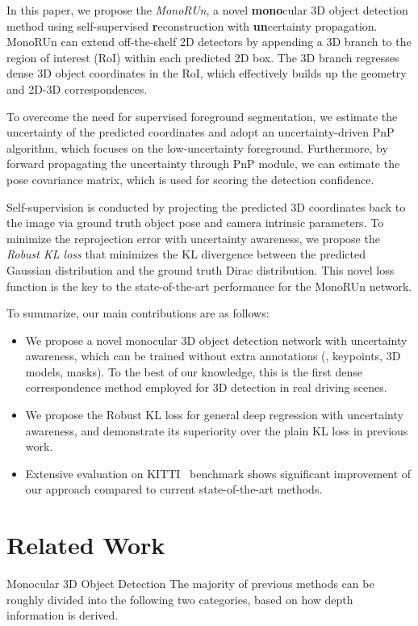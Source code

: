 \documentclass[10pt,twocolumn,letterpaper]{article}
\makeatletter
\renewcommand{\paragraph}{
  \@startsection{paragraph}{4}
  {\z@}{0.7ex \@plus .2ex \@minus .1ex}{-1em}
  {\normalfont\normalsize\bfseries}
}
\makeatother
\begin{document}
In this paper, we propose the \textit{MonoRUn}, a novel \textbf{mono}cular 3D object detection method using self-supervised \textbf{r}econstruction with \textbf{un}certainty propagation. MonoRUn can extend off-the-shelf 2D detectors by appending a 3D branch to the region of interest (RoI) within each predicted 2D box. The 3D branch regresses dense 3D object coordinates in the RoI, which effectively builds up the geometry and 2D-3D correspondences. 

To overcome the need for supervised foreground segmentation, we estimate the uncertainty of the predicted coordinates and adopt an uncertainty-driven PnP algorithm, which focuses on the low-uncertainty foreground. Furthermore, by forward propagating the uncertainty through PnP module, we can estimate the pose covariance matrix, which is used for scoring the detection confidence.

Self-supervision is conducted by projecting the predicted 3D coordinates back to the image via ground truth object pose and camera intrinsic parameters. To minimize the reprojection error with uncertainty awareness, we propose the \textit{Robust KL loss} that minimizes the KL divergence between the predicted Gaussian distribution and the ground truth Dirac distribution. This novel loss function is the key to the state-of-the-art performance for the MonoRUn network.

To summarize, our main contributions are as follows: 
\begin{itemize}[noitemsep,topsep=0.7ex]
    \item We propose a novel monocular 3D object detection network with uncertainty awareness,
    which can be trained without extra annotations (\eg, keypoints, 3D models, masks). To the best of our knowledge, this is the first dense correspondence method employed for 3D detection in real driving scenes. 
    \item We propose the Robust KL loss for general deep regression with uncertainty awareness, and demonstrate its superiority over the plain KL loss in previous work.
    \item Extensive evaluation on KITTI~\cite{kitti} benchmark shows significant improvement of our approach compared to current state-of-the-art methods.
\end{itemize}

\section{Related Work}
\paragraph{Monocular 3D Object Detection} 
The majority of previous methods can be roughly divided into the following two categories, based on how depth information is derived.
\end{document}
